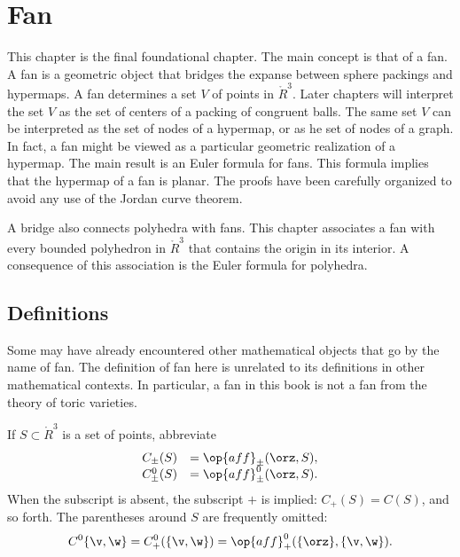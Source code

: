 \chapter{Fan}\label{sec:fan}




\begin{summary}
This chapter is the final foundational chapter.  The main concept is
that of a fan.  A fan is a geometric object that bridges the expanse
between sphere packings and hypermaps.  A fan determines a set $V$
of points in $\ring{R}^3$.  Later chapters will interpret the set
$V$ as the set of centers of a packing of congruent balls.  The same
set $V$ can be interpreted as the set of nodes of a hypermap, or as
he set of nodes of a graph.  In fact, a fan might be viewed as a
particular geometric realization of a hypermap.  The main result is
an Euler formula for fans.  This formula implies that the hypermap
of a fan is planar.  The proofs have been carefully organized to
avoid any use of the Jordan curve theorem.


A bridge also connects polyhedra with fans.  This chapter associates
a fan with every bounded polyhedron in $\ring{R}^3$ that contains
the origin in its interior.  A consequence of this association is
the Euler formula for polyhedra.
\end{summary}


%
%
%
%
%

\section{Definitions}



\begin{remark}
Some may have already encountered other mathematical objects that go
by the name of fan.  The definition of fan here is unrelated to its
definitions in other mathematical contexts.  In particular, a fan in
this book is not a fan from the theory of toric varieties.
\end{remark}



If $S\subset\ring{R}^3$ is a set of points,
abbreviate
\begin{displaymath}
\begin{array}{lll}
C_\pm(S) &= \op{aff}_\pm(\orz,S),\\
C^0_\pm(S) &= \op{aff}^0_\pm(\orz,S).\\
\end{array}
\end{displaymath}
When the subscript is absent, the subscript $+$ is implied: $C_+(S)
= C(S)$, and so forth.  The parentheses around $S$ are frequently
omitted:
\begin{displaymath}C^0\{\v,\w\}=C^0_+(\{\v,\w\}) =
\op{aff}^0_+(\{\orz\},\{\v,\w\}).\end{displaymath}

